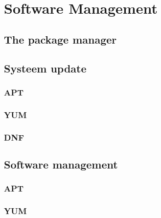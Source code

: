 \documentclass[a4paper,12pt,twoside,openright,titlepage]{book}
\begin{document}
\chapter{Software Management}

\section{The package manager}

\section{Systeem update}

\subsection{APT}

\subsection{YUM}

\subsection{DNF}

\section{Software management}

\subsection{APT}

\subsection{YUM}

\end{document}
